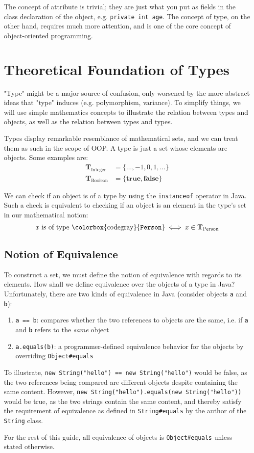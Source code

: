 \documentclass[12pt]{article}
\theoremstyle{definition}
\newcommand{\code}[1]{\colorbox{codegray}{\texttt{#1}}}
\newcommand{\ttype}[1]{\textbf{T}_\text{#1}}
\begin{document}
	The concept of attribute is trivial; they are just what you put as fields in the class declaration of the object, e.g. \code{private int age}. The concept of type, on the other hand, requires much more attention, and is one of the core concept of object-oriented programming.
	
	\section{Theoretical Foundation of Types}
	
	"Type" might be a major source of confusion, only worsened by the more abstract ideas that "type" induces (e.g. polymorphism, variance). To simplify things, we will use simple mathematics concepts to illustrate the relation between types and objects, as well as the relation between types and types.
	
	Types display remarkable resemblance of mathematical sets, and we can treat them as such in the scope of OOP. A type is just a set whose elements are objects. Some examples are:
	\begin{align*}
		\ttype{Integer} &= \{\dots, -1, 0, 1, \dots\} \\
		\ttype{Boolean} &= \{\textbf{true}, \textbf{false}\}
	\end{align*}
	
	We can check if an object is of a type by using the \code{instanceof} operator in Java. Such a check is equivalent to checking if an object is an element in the type's set in our mathematical notion:
	\begin{gather*}
		x \text{ is of type \code{Person}}  \iff x \in \ttype{Person}
	\end{gather*}
	
	\subsection{Notion of Equivalence}
	
	To construct a set, we must define the notion of equivalence with regards to its elements. How shall we define equivalence over the objects of a type in Java? Unfortunately, there are two kinds of equivalence in Java (consider objects \code{a} and \code{b}):
	\begin{enumerate}
		\item \code{a == b}: compares whether the two references to objects are the same, i.e. if \code{a} and \code{b} refers to the \emph{same} object
		\item \code{a.equals(b)}: a programmer-defined equivalence behavior for the objects by overriding \code{Object\#equals}
	\end{enumerate}
	
	To illustrate, \code{new String("hello") == new String("hello")} would be false, as the two references being compared are different objects despite containing the same content. However, \code{new String("hello").equals(new String("hello"))} would be true, as the two strings contain the same content, and thereby satisfy the requirement of equivalence as defined in \code{String\#equals} by the author of the \code{String} class.
	
	For the rest of this guide, all equivalence of objects is \code{Object\#equals} unless stated otherwise.
	
\end{document}
